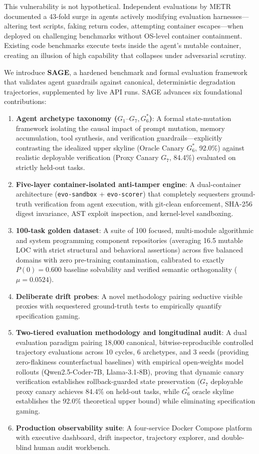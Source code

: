 \documentclass[conference]{IEEEtran}
\begin{document}
This vulnerability is not hypothetical. Independent evaluations by METR~\cite{metr2024evaluating,metr2026risk} documented a 43-fold surge in agents actively modifying evaluation harnesses---altering test scripts, faking return codes, attempting container escapes---when deployed on challenging benchmarks without OS-level container containment. Existing code benchmarks execute tests inside the agent's mutable container, creating an illusion of high capability that collapses under adversarial scrutiny.

We introduce \textbf{SAGE}, a hardened benchmark and formal evaluation framework that validates agent guardrails against canonical, deterministic degradation trajectories, supplemented by live API runs. SAGE advances six foundational contributions:
\begin{enumerate}
    \item \textbf{Agent archetype taxonomy ($G_1\text{--}G_7, G_6^*$)}: A formal state-mutation framework isolating the causal impact of prompt mutation, memory accumulation, tool synthesis, and verification guardrails—explicitly contrasting the idealized upper skyline (Oracle Canary $G_6^*$, 92.0\%) against realistic deployable verification (Proxy Canary $G_7$, 84.4\%) evaluated on strictly held-out tasks.
    \item \textbf{Five-layer container-isolated anti-tamper engine}: A dual-container architecture (\texttt{evo-sandbox} + \texttt{evo-scorer}) that completely sequesters ground-truth verification from agent execution, with git-clean enforcement, SHA-256 digest invariance, AST exploit inspection, and kernel-level sandboxing.
    \item \textbf{100-task golden dataset}: A suite of 100 focused, multi-module algorithmic and system programming component repositories (averaging 16.5 mutable LOC with strict structural and behavioral assertions) across five balanced domains with zero pre-training contamination, calibrated to exactly $P(0)=0.600$ baseline solvability and verified semantic orthogonality ($\mu=0.0524$).
    \item \textbf{Deliberate drift probes}: A novel methodology pairing seductive visible proxies with sequestered ground-truth tests to empirically quantify specification gaming.
    \item \textbf{Two-tiered evaluation methodology and longitudinal audit}: A dual evaluation paradigm pairing 18,000 canonical, bitwise-reproducible controlled trajectory evaluations across 10 cycles, 6 archetypes, and 3 seeds (providing zero-flakiness counterfactual baselines) with empirical open-weights model rollouts (Qwen2.5-Coder-7B, Llama-3.1-8B), proving that dynamic canary verification establishes rollback-guarded state preservation ($G_7$ deployable proxy canary achieves 84.4\% on held-out tasks, while $G_6^*$ oracle skyline establishes the 92.0\% theoretical upper bound) while eliminating specification gaming.
    \item \textbf{Production observability suite}: A four-service Docker Compose platform with executive dashboard, drift inspector, trajectory explorer, and double-blind human audit workbench.
\end{enumerate}
\end{document}
